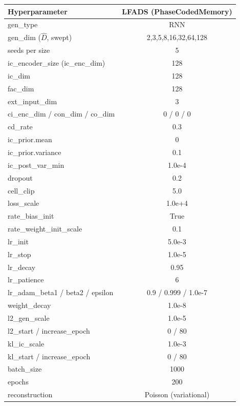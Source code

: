 \documentclass{article}
\begin{document}
\begin{table}[ht]
\centering
\small
\begin{tabular}{|l|c|}
\hline
\textbf{Hyperparameter} & \textbf{LFADS (PhaseCodedMemory)} \\ \hline
gen\_type & RNN \\ \hline
gen\_dim ($\hat{D}$, swept) & 2,3,5,8,16,32,64,128 \\ \hline
seeds per size & 5 \\ \hline
ic\_encoder\_size (ic\_enc\_dim) & 128 \\ \hline
ic\_dim & 128 \\ \hline
fac\_dim & 128 \\ \hline
ext\_input\_dim & 3 \\ \hline
ci\_enc\_dim / con\_dim / co\_dim & 0 / 0 / 0 \\ \hline
cd\_rate & 0.3 \\ \hline
ic\_prior.mean & 0 \\ \hline
ic\_prior.variance & 0.1 \\ \hline
ic\_post\_var\_min & 1.0e-4 \\ \hline
dropout & 0.2 \\ \hline
cell\_clip & 5.0 \\ \hline
loss\_scale & 1.0e+4 \\ \hline
rate\_bias\_init & True \\ \hline
rate\_weight\_init\_scale & 0.1 \\ \hline
lr\_init & 5.0e-3 \\ \hline
lr\_stop & 1.0e-5 \\ \hline
lr\_decay & 0.95 \\ \hline
lr\_patience & 6 \\ \hline
lr\_adam\_beta1 / beta2 / epsilon & 0.9 / 0.999 / 1.0e-7 \\ \hline
weight\_decay & 1.0e-8 \\ \hline
l2\_gen\_scale & 1.0e-5 \\ \hline
l2\_start / increase\_epoch & 0 / 80 \\ \hline
kl\_ic\_scale & 1.0e-3 \\ \hline
kl\_start / increase\_epoch & 0 / 80 \\ \hline
batch\_size & 1000 \\ \hline
epochs & 200 \\ \hline
reconstruction & Poisson (variational) \\ \hline
\end{tabular}

\end{table}
\end{document}
